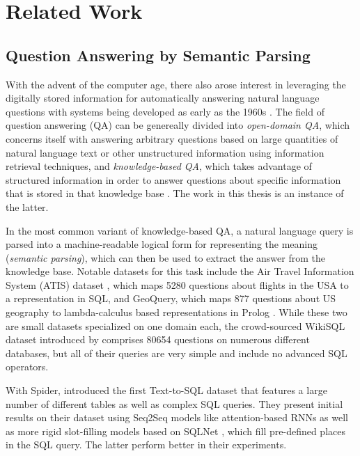 \chapter{Related Work}
\label{ch:related-work}

\section{Question Answering by Semantic Parsing}

With the advent of the computer age, there also arose interest in leveraging the
digitally stored information for automatically answering natural language
questions with systems being developed as early as the 1960s
\parencite[e.g.]{green-1961}. The field of question answering (QA) can be
genereally divided into \emph{open-domain QA}, which concerns itself with
answering arbitrary questions based on large quantities of natural language text
or other unstructured information using information retrieval techniques, and
\emph{knowledge-based QA}, which takes advantage of structured information in
order to answer questions about specific information that is stored in that
knowledge base \parencites[cf.]{molla-2007}{jurafsky-2021}. The work in this
thesis is an instance of the latter.

In the most common variant of knowledge-based QA, a natural language query is
parsed into a machine-readable logical form for representing the meaning
(\emph{semantic parsing}), which can then be used to extract the answer from the
knowledge base. Notable datasets for this task include the Air Travel
Information System (ATIS) dataset \parencite{hemphill-1990}, which maps
\num{5280} questions about flights in the USA to a representation in SQL, and
GeoQuery, which maps \num{877} questions about US geography to lambda-calculus
based representations in Prolog \parencite{zelle-1996}. While these two are
small datasets specialized on one domain each, the crowd-sourced WikiSQL dataset
introduced by \textcite{zhong-2017} comprises \num{80654} questions on numerous
different databases, but all of their queries are very simple and include no
advanced SQL operators.

With Spider, \textcite{yu-2018} introduced the first Text-to-SQL dataset that
features a large number of different tables as well as complex SQL queries.
They present initial results on their dataset using Seq2Seq models like
attention-based RNNs as well as more rigid slot-filling models based on SQLNet
\parencite{xu-2017}, which fill pre-defined places in the SQL query. The latter
perform better in their experiments.

